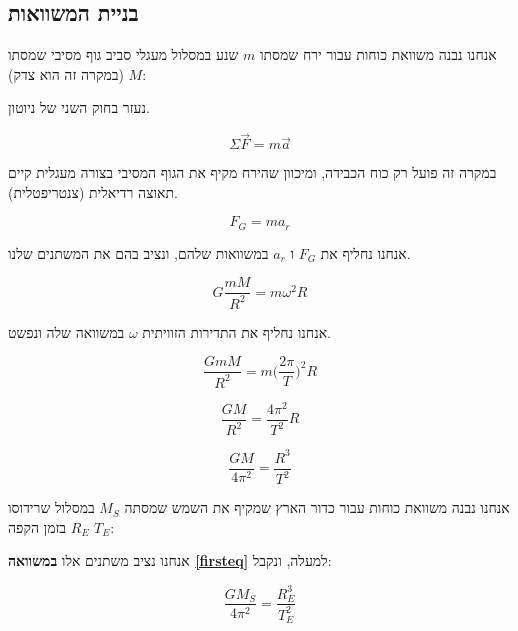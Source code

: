 \documentclass[a4paper, 12pt]{article}
\begin{document}
    \pagebreak %

    \subsection{בניית המשוואות }

    \begin{flushright}
        אנחנו נבנה
        משוואת כוחות עבור ירח שמסתו $m$ שנע במסלול מעגלי סביב גוף מסיבי שמסתו $M$ (במקרה זה הוא צדק):
        
        נעזר בחוק השני של ניוטון.

        $$ \Sigma \vec{F} = m\vec{a} $$ 

        במקרה זה פועל רק כוח הכבידה, ומיכוון שהירח מקיף את הגוף המסיבי בצורה מעגלית
        קיים תאוצה רדיאלית (צנטריפטלית). 

        $$ F_G = ma_r $$

        אנחנו נחליף את $F_G$ ו $a_r$ במשוואות שלהם, ונציב בהם את המשתנים שלנו.

        $$ G\dfrac{mM}{R^2} = m \omega^2 R$$

        אנחנו נחליף את התדירות הזוויתית $\omega$ במשוואה שלה ונפשט.
        
        $$ \dfrac{GmM}{R^2} = m \biggl(\dfrac{2\pi}{T}\biggl)^2 R $$
        
        $$ \dfrac{GM}{R^2} = \dfrac{4\pi^2}{T^2} R $$
    \end{flushright}

    \begin{english}
        \begin{equation}
            \label{firsteq}
            \dfrac{GM}{4\pi^2} = \dfrac{R^3}{T^2}
        \end{equation}
    \end{english}

    \begin{flushright}
        אנחנו נבנה
        משוואת כוחות עבור כדור הארץ שמקיף את השמש שמסתה $M_S$ במסלול שרידוסו
        $R_E$ בזמן הקפה $T_E$:

        אנחנו נציב משתנים אלו \textbf{במשוואה \ref{firsteq}} למעלה, ונקבל:
    \end{flushright}

    \begin{english}
        \begin{equation}
            \label{secondeq}
            \dfrac{GM_S}{4\pi^2} = \dfrac{R_E^3}{T_E^2}
        \end{equation}
    \end{english}
\end{document}
